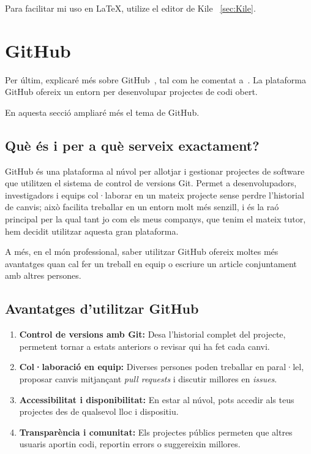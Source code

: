 Para facilitar mi uso en LaTeX, utilize el editor de Kile ~\ref{sec:Kile}.

\section{GitHub}
Per últim, explicaré més sobre GitHub~\cite{GitHub}, tal com he comentat a~. La plataforma GitHub ofereix un entorn per desenvolupar projectes de codi obert.

En aquesta secció ampliaré més el tema de GitHub.

\subsection{Què és i per a què serveix exactament?}
GitHub és una plataforma al núvol per allotjar i gestionar projectes de software que utilitzen el sistema de control de versions Git. Permet a desenvolupadors, investigadors i equips col·laborar en un mateix projecte sense perdre l’historial de canvis; això facilita treballar en un entorn molt més senzill, i és la raó principal per la qual tant jo com els meus companys, que tenim el mateix tutor, hem decidit utilitzar aquesta gran plataforma.

A més, en el món professional, saber utilitzar GitHub ofereix moltes més avantatges quan cal fer un treball en equip o escriure un article conjuntament amb altres persones.

\subsection{Avantatges d’utilitzar GitHub}
\begin{enumerate}
 \item \textbf{Control de versions amb Git:} Desa l’historial complet del projecte, permetent tornar a estats anteriors o revisar qui ha fet cada canvi.
 \item \textbf{Col·laboració en equip:} Diverses persones poden treballar en paral·lel, proposar canvis mitjançant \textit{pull requests} i discutir millores en \textit{issues}.
 \item \textbf{Accessibilitat i disponibilitat:} En estar al núvol, pots accedir als teus projectes des de qualsevol lloc i dispositiu.
 \item \textbf{Transparència i comunitat:} Els projectes públics permeten que altres usuaris aportin codi, reportin errors o suggereixin millores.
\end{enumerate}

